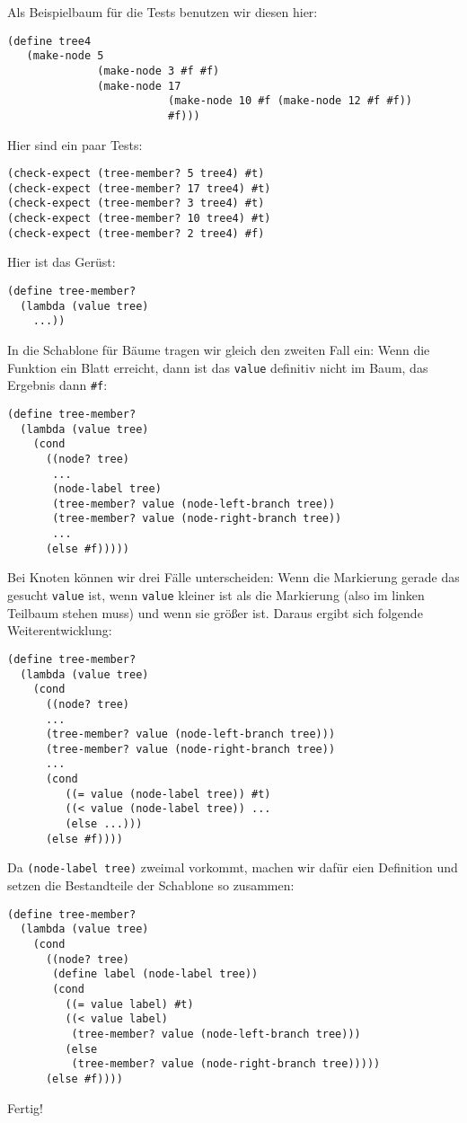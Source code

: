 Als Beispielbaum für die Tests benutzen wir diesen hier:
%
\begin{lstlisting}
(define tree4
   (make-node 5
              (make-node 3 #f #f)
              (make-node 17
                         (make-node 10 #f (make-node 12 #f #f))
                         #f)))
\end{lstlisting}
%
Hier sind ein paar Tests:
%
\begin{lstlisting}
(check-expect (tree-member? 5 tree4) #t)
(check-expect (tree-member? 17 tree4) #t)
(check-expect (tree-member? 3 tree4) #t)
(check-expect (tree-member? 10 tree4) #t)
(check-expect (tree-member? 2 tree4) #f)
\end{lstlisting}
%
Hier ist das Gerüst:
\begin{lstlisting}
(define tree-member?
  (lambda (value tree)
    ...))
\end{lstlisting}
%
In die Schablone für Bäume tragen wir gleich den zweiten Fall ein:
Wenn die Funktion ein Blatt erreicht, dann ist das \lstinline{value}
definitiv nicht im Baum, das Ergebnis dann \lstinline{#f}:
%
\begin{lstlisting}
(define tree-member?
  (lambda (value tree)
    (cond
      ((node? tree)
       ...
       (node-label tree)
       (tree-member? value (node-left-branch tree))
       (tree-member? value (node-right-branch tree))
       ...
      (else #f)))))
\end{lstlisting}
%
Bei Knoten können wir drei Fälle unterscheiden: Wenn die Markierung
gerade das gesucht \lstinline{value} ist, wenn \lstinline{value}
kleiner ist als die Markierung (also im linken Teilbaum stehen muss)
und wenn sie größer ist.  Daraus ergibt sich folgende
Weiterentwicklung:
\begin{lstlisting}
(define tree-member?
  (lambda (value tree)
    (cond
      ((node? tree)
      ...
      (tree-member? value (node-left-branch tree)))
      (tree-member? value (node-right-branch tree))
      ...
      (cond
         ((= value (node-label tree)) #t)
         ((< value (node-label tree)) ...
         (else ...)))
      (else #f))))
\end{lstlisting}
%
Da \lstinline{(node-label tree)} zweimal vorkommt, machen wir dafür
eien Definition und setzen die Bestandteile der Schablone so zusammen:
%
\begin{lstlisting}
(define tree-member?
  (lambda (value tree)
    (cond
      ((node? tree)
       (define label (node-label tree))
       (cond
         ((= value label) #t)
         ((< value label)
          (tree-member? value (node-left-branch tree)))
         (else
          (tree-member? value (node-right-branch tree)))))
      (else #f))))
\end{lstlisting}
%
Fertig!

